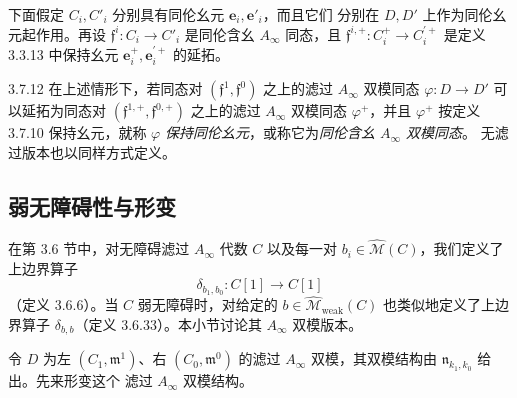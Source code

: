 下面假定 $C_i,C'_i$ 分别具有同伦幺元 $\mathbf e_i,\mathbf e'_i$，而且它们
分别在 $D,D'$ 上作为同伦幺元起作用。再设
$\mathfrak f^i\colon C_i\to C'_i$ 是同伦含幺 $A_\infty$ 同态，且
$\mathfrak f^{i,+}\colon C_i^+\to C_i^{\prime+}$ 是定义 3.3.13 中保持幺元
$\mathbf e_i^+,\mathbf e_i^{\prime+}$ 的延拓。

\begin{definition}{3.7.12}\label{def:3-7-12}
在上述情形下，若同态对 $(\mathfrak f^1,\mathfrak f^0)$ 之上的滤过
$A_\infty$ 双模同态 $\varphi\colon D\to D'$ 可以延拓为同态对
$(\mathfrak f^{1,+},\mathfrak f^{0,+})$ 之上的滤过 $A_\infty$ 双模同态
$\varphi^+$，并且 $\varphi^+$ 按定义 3.7.10 保持幺元，就称 $\varphi$
\emph{保持同伦幺元}，或称它为\emph{同伦含幺 $A_\infty$ 双模同态}。
无滤过版本也以同样方式定义。
\end{definition}

\subsection{弱无障碍性与形变}
\label{subsec:3-7-3}

在第 3.6 节中，对无障碍滤过 $A_\infty$ 代数 $C$ 以及每一对
$b_i\in\widehat{\mathcal M}(C)$，我们定义了上边界算子
\[
  \delta_{b_1,b_0}\colon C[1]\longrightarrow C[1]
\]
（定义 3.6.6）。当 $C$ 弱无障碍时，对给定的
$b\in\widehat{\mathcal M}_{\mathrm{weak}}(C)$ 也类似地定义了上边界算子
$\delta_{b,b}$（定义 3.6.33）。本小节讨论其 $A_\infty$ 双模版本。

令 $D$ 为左 $(C_1,\mathfrak m^1)$、右 $(C_0,\mathfrak m^0)$ 的滤过
$A_\infty$ 双模，其双模结构由 $\mathfrak n_{k_1,k_0}$ 给出。先来形变这个
滤过 $A_\infty$ 双模结构。

